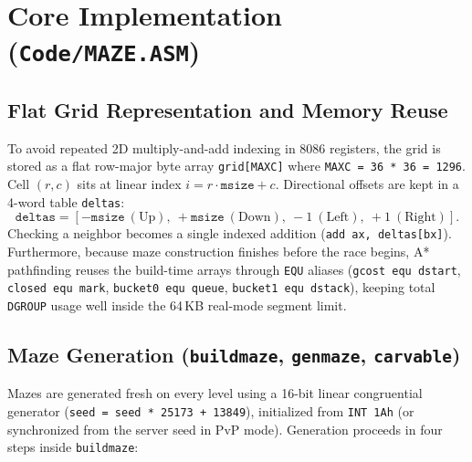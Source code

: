 \documentclass[11pt,a4paper]{article}
\begin{document}
\section{Core Implementation (\texttt{Code/MAZE.ASM})}

\subsection{Flat Grid Representation and Memory Reuse}
To avoid repeated 2D multiply-and-add indexing in 8086 registers, the grid is stored as a flat row-major byte array \texttt{grid[MAXC]} where \texttt{MAXC = 36 * 36 = 1296}. Cell $(r, c)$ sits at linear index $i = r \cdot \texttt{msize} + c$. Directional offsets are kept in a 4-word table \texttt{deltas}:
\[
\texttt{deltas} = [-\texttt{msize}\ (\text{Up}),\ +\texttt{msize}\ (\text{Down}),\ -1\ (\text{Left}),\ +1\ (\text{Right})].
\]
Checking a neighbor becomes a single indexed addition (\texttt{add ax, deltas[bx]}). Furthermore, because maze construction finishes before the race begins, A* pathfinding reuses the build-time arrays through \texttt{EQU} aliases (\texttt{gcost equ dstart}, \texttt{closed equ mark}, \texttt{bucket0 equ queue}, \texttt{bucket1 equ dstack}), keeping total \texttt{DGROUP} usage well inside the 64\,KB real-mode segment limit.

\subsection{Maze Generation (\texttt{buildmaze}, \texttt{genmaze}, \texttt{carvable})}
Mazes are generated fresh on every level using a 16-bit linear congruential generator (\texttt{seed = seed * 25173 + 13849}), initialized from \texttt{INT 1Ah} (or synchronized from the server seed in PvP mode). Generation proceeds in four steps inside \texttt{buildmaze}:
\end{document}

